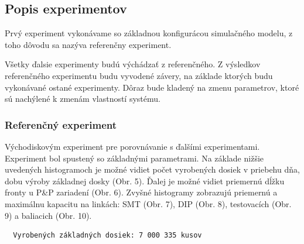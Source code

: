 \documentclass[12pt,a4paper,titlepage,final]{article}
\begin{document}
\subsection{Popis experimentov}
Prvý experiment vykonávame so základnou konfigurácou simulačného modelu, z toho 
dôvodu sa nazýva referenčny experiment. 

Všetky ďalsie experimenty budú výchádzať z referenčného. Z výsledkov referenčného
experimentu budu vyvodené závery, na základe ktorých budu vykonávané ostané experimenty.
Dôraz bude kladený na zmenu parametrov, ktoré sú nachýlené k zmenám vlastností
systému.

\subsubsection{Referenčný experiment}
Východiskovým experiment pre porovnávanie s ďalšími experimentami.
Experiment bol spustený so základnými parametrami. Na základe nižšie uvedených histogramoch
je možné vidiet počet vyrobených dosiek v priebehu dňa, dobu 
výroby základnej dosky (Obr. 5). Ďalej je možné vidiet priemernú dĺžku
fronty u P\&P zariadení (Obr. 6). Zvyšné histogramy zobrazujú priemernú a maximálnu
kapacitu na linkách: SMT (Obr. 7), DIP (Obr. 8), testovacích (Obr. 9) a baliacich (Obr. 10).

\begin{verbatim}
  Vyrobených základných dosiek: 7 000 335 kusov
\end{verbatim}
\end{document}

